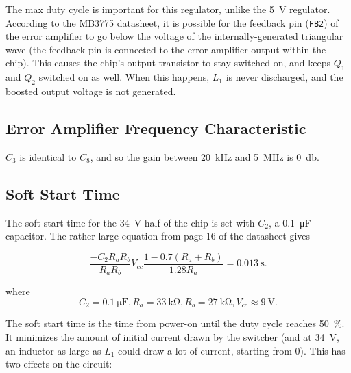 \documentclass{article}
\newcommand{\chippin}{\texttt}
\newcommand{\model}{\textsf}
\begin{document}

The max duty cycle is important for this regulator, unlike the
\qty{5}{\volt} regulator. According to the \model{MB3775} datasheet,
it is possible for the feedback pin (\chippin{FB2}) of the error
amplifier to go below the voltage of the internally-generated
triangular wave (the feedback pin is connected to the error amplifier
output within the chip). This causes the chip's output transistor to
stay switched on, and keeps $Q_1$ and $Q_2$ switched on as well. When
this happens, $L_1$ is never discharged, and the boosted output
voltage is not generated.

\subsection{Error Amplifier Frequency Characteristic}
$C_3$ is identical to $C_8$, and so the gain between
\qty{20}{\kilo\hertz} and \qty{5}{\mega\hertz} is
\qty{0}{\decibel}.

\subsection{Soft Start Time}
The soft start time for the \qty{34}{\volt} half of the chip is set
with $C_2$, a \qty{0.1}{\micro\farad} capacitor. The rather large
equation from page 16 of the datasheet gives

\begin{displaymath}
  \frac{-C_2R_aR_b}{R_aR_b}V_{cc}\frac{1-0.7(R_a+R_b)}{1.28R_a}
  = \qty{0.013}{\second}.
\end{displaymath}

\noindent
where
\begin{displaymath}
  C_2 = \qty{0.1}{\micro\farad},R_a =
  \qty{33}{\kilo\ohm},R_b=\qty{27}{\kilo\ohm},V_{cc} \approx{} \qty{9}{\volt}.
\end{displaymath}

The soft start time is the time from power-on until the duty cycle
reaches \qty{50}{\%}. It minimizes the amount of initial current drawn
by the switcher (and at \qty{34}{\volt}, an inductor as large as $L_1$
could draw a lot of current, starting from 0). This has two effects on
the circuit:
\end{document}
